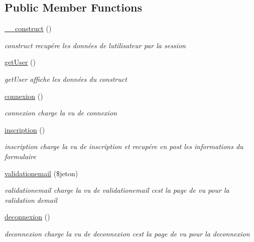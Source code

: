 \subsection*{Public Member Functions}
\begin{DoxyCompactItemize}
\item 
\mbox{\hyperlink{classusers_model_abb86d91f199111023f62b2d884cf100d}{\+\_\+\+\_\+construct}} ()
\begin{DoxyCompactList}\small\item\em construct recupére les données de l\textquotesingle{}utilisateur par la session \end{DoxyCompactList}\item 
\mbox{\hyperlink{classusers_model_aa5a342b8ea5229f90754660446a4cb08}{get\+User}} ()
\begin{DoxyCompactList}\small\item\em get\+User affiche les données du construct \end{DoxyCompactList}\item 
\mbox{\hyperlink{classusers_model_ae77247bdc2a5a49190b4877516515031}{connexion}} ()
\begin{DoxyCompactList}\small\item\em connexion charge la vu de connexion \end{DoxyCompactList}\item 
\mbox{\hyperlink{classusers_model_ae3e80f2e571d867274c8c4f94092322f}{inscription}} ()
\begin{DoxyCompactList}\small\item\em inscription charge la vu de inscription et recupére en post les informations du formulaire \end{DoxyCompactList}\item 
\mbox{\hyperlink{classusers_model_a7dda6a2746d9f7bb2256f1b01d0276e8}{validationemail}} (\$jeton)
\begin{DoxyCompactList}\small\item\em validationemail charge la vu de validationemail c\textquotesingle{}est la page de vu pour la validation d\textquotesingle{}email \end{DoxyCompactList}\item 
\mbox{\hyperlink{classusers_model_a36138824d4c6ecdcd626fa1bac2c7335}{deconnexion}} ()
\begin{DoxyCompactList}\small\item\em deconnexion charge la vu de deconnexion c\textquotesingle{}est la page de vu pour la deconnexion \end{DoxyCompactList}\item 

\end{DoxyCompactItemize}
